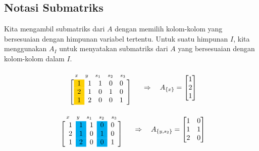 \subsection*{Notasi Submatriks}
Kita mengambil submatriks dari \( A \) dengan memilih kolom-kolom yang bersesuaian dengan himpunan variabel tertentu.  
Untuk suatu himpunan \( I \), kita menggunakan \( A_I \) untuk menyatakan submatriks dari \( A \) yang bersesuaian dengan kolom-kolom dalam \( I \).

\bigskip

\[
\begin{array}{c}
\begin{array}{ccccc}
\scriptstyle x & \scriptstyle y & \scriptstyle s_1 & \scriptstyle s_2 & \scriptstyle s_3
\end{array} \\
\left[
\begin{array}{>{\columncolor{yellow}}c c c c c}
1 & 1 & 1 & 0 & 0 \\
2 & 1 & 0 & 1 & 0 \\
1 & 2 & 0 & 0 & 1
\end{array}
\right]
\end{array}
\quad
\Rightarrow
\quad
A_{\{x\}} =
\begin{bmatrix}
1 \\
2 \\
1
\end{bmatrix}
\]

\bigskip

\[
\begin{array}{c}
\begin{array}{ccccc}
\scriptstyle x & \scriptstyle y & \scriptstyle s_1 & \scriptstyle s_2 & \scriptstyle s_3
\end{array} \\
\left[
\begin{array}{c>{\columncolor{cyan}}c c >{\columncolor{cyan}}c c}
1 & 1 & 1 & 0 & 0 \\
2 & 1 & 0 & 1 & 0 \\
1 & 2 & 0 & 0 & 1
\end{array}
\right]
\end{array}
\quad
\Rightarrow
\quad
A_{\{y, s_2\}} =
\begin{bmatrix}
1 & 0 \\
1 & 1 \\
2 & 0
\end{bmatrix}
\]
\bigskip

